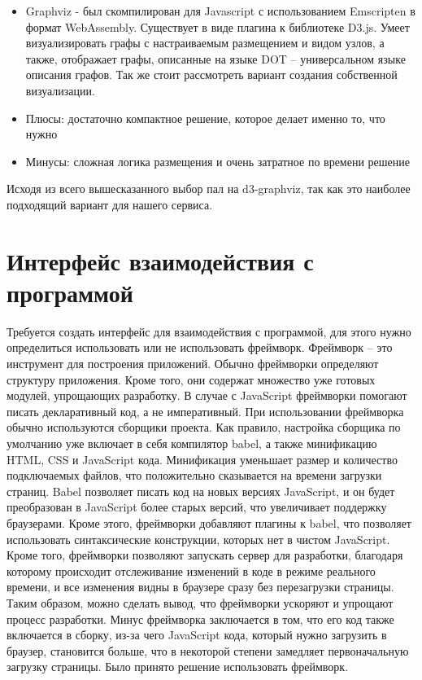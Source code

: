 \begin{itemize}
\item Graphviz - был скомпилирован для Javascript с использованием Emscripten в формат WebAssembly. Существует в виде плагина к библиотеке D3.js. Умеет визуализировать графы с настраиваемым размещением и видом узлов, а также, отображает графы, описанные на языке DOT – универсальном языке описания графов.
Так же стоит рассмотреть вариант создания собственной визуализации.
\item Плюсы: достаточно компактное решение, которое делает именно то, что нужно
\item Минусы: сложная логика размещения и очень затратное по времени решение
\end{itemize}
Исходя из всего вышесказанного выбор пал на d3-graphviz, так как это наиболее подходящий вариант для нашего сервиса.
\section{Интерфейс взаимодействия с программой} \label{ch4:sec4}
Требуется создать интерфейс для взаимодействия с программой, для этого нужно определиться использовать или не использовать фреймворк.
Фреймворк – это инструмент для построения приложений. Обычно фреймворки определяют структуру приложения. Кроме того, они содержат множество уже готовых модулей, упрощающих разработку. В случае с JavaScript фреймворки помогают писать декларативный код, а не императивный. При использовании фреймворка обычно используются сборщики проекта. Как правило, настройка сборщика по умолчанию уже включает в себя компилятор babel, а также минификацию HTML, CSS и JavaScript кода. Минификация уменьшает размер и количество подключаемых файлов, что положительно сказывается на времени загрузки страниц. Babel позволяет писать код на новых версиях JavaScript, и он будет преобразован в JavaScript более старых версий, что увеличивает поддержку браузерами. Кроме этого, фреймворки добавляют плагины к babel, что позволяет использовать синтаксические конструкции, которых нет в чистом JavaScript. Кроме того, фреймворки позволяют запускать сервер для разработки, благодаря которому происходит отслеживание изменений в коде в режиме реального времени, и все изменения видны в браузере сразу без перезагрузки страницы.
Таким образом, можно сделать вывод, что фреймворки ускоряют и упрощают процесс разработки. Минус фреймворка заключается в том, что его код также включается в сборку, из-за чего JavaScript кода, который нужно загрузить в браузер, становится больше, что в некоторой степени замедляет первоначальную загрузку страницы. Было принято решение использовать фреймворк.
